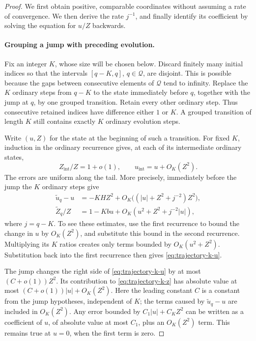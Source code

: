 \begin{proof}
We first obtain positive, comparable coordinates without assuming a
rate of convergence.  We then derive the rate $j^{-1}$, and finally
identify its coefficient by solving the equation for $u/Z$ backwards.

\paragraph{Grouping a jump with preceding evolution.}
Fix an integer $K$, whose size will be chosen below.  Discard finitely
many initial indices so that the intervals $[q-K,q]$, $q\in\mathcal Q$,
are disjoint.  This is possible because the gaps between consecutive
elements of $\mathcal Q$ tend to infinity.  Replace the $K$ ordinary
steps from $q-K$ to the state immediately before $q$, together with
the jump at $q$, by one grouped transition.  Retain every other
ordinary step.  Thus consecutive retained indices have difference
either $1$ or $K$.  A grouped transition of length $K$ still contains
exactly $K$ ordinary evolution steps.

Write $(u,Z)$ for the state at the beginning of such a transition.
For fixed $K$, induction in the ordinary recurrence gives, at each
of its intermediate ordinary states,
\[
 Z_{\mathrm{int}}/Z=1+o(1),\qquad
 u_{\mathrm{int}}=u+O_K(Z^2).
\]
The errors are uniform along the tail.  More precisely, immediately
before the jump the $K$ ordinary steps give
\begin{align}
 \widetilde u_q-u
   &=-KHZ^2+O_K\bigl((|u|+Z^2+j^{-2})Z^2\bigr),
       \label{eq:trajectory-k-u}\\
 \widetilde Z_q/Z
   &=1-Kbu+O_K(u^2+Z^2+j^{-2}|u|),
       \label{eq:trajectory-k-z}
\end{align}
where $j=q-K$.  To see these estimates, use the first recurrence to
bound the change in $u$ by $O_K(Z^2)$, and substitute this bound in the
second recurrence.  Multiplying its $K$ ratios creates only terms
bounded by $O_K(u^2+Z^2)$.  Substitution back into the first recurrence
then gives \eqref{eq:trajectory-k-u}.

The jump changes the right side of \eqref{eq:trajectory-k-u} by at
most $(C+o(1))Z^2$.  Its contribution to
\eqref{eq:trajectory-k-z} has absolute value at most
$(C+o(1))|u|+O_K(Z^2)$.  Here the leading constant $C$ is a constant
from the jump hypotheses, independent of $K$; the terms caused by
$\widetilde u_q-u$ are included in $O_K(Z^2)$.  Any error bounded by
$C_1|u|+C_KZ^2$ can be written as a coefficient of $u$, of absolute
value at most $C_1$, plus an $O_K(Z^2)$ term.  This remains true at
$u=0$, when the first term is zero.


\end{proof}
